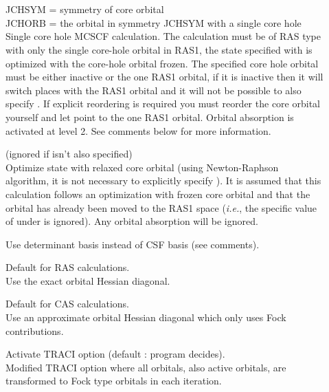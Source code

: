 \begin{description}
\item[] \ \\
   \\
  JCHSYM = symmetry of core orbital\\
  JCHORB = the orbital in symmetry JCHSYM with a single core hole\\
  Single core hole MCSCF calculation. The calculation must be of RAS type
  with only the single core-hole orbital in RAS1, the state specified with
   is optimized with the core-hole orbital
  frozen.
  The specified core hole orbital must be either inactive or
  the one RAS1 orbital, if it is inactive then it will switch places with
  the RAS1 orbital and it will not be possible to also
  specify . If explicit reordering is required you must reorder
  the core orbital yourself and let  point to the one RAS1 orbital.
  Orbital absorption is activated at level 2. See comments below for more information.

\item[]
  (ignored if  isn't also specified)\\
  Optimize state with relaxed core orbital (using Newton-Raphson algorithm,
  it is not necessary to explicitly specify ).
  It is assumed that this calculation follows an optimization
  with frozen core orbital and that the orbital has already been
  moved to the RAS1 space ({\it i.e.\/}, the specific value of
   under  is ignored). Any
  orbital absorption   will be ignored.

\item[]
  Use determinant basis instead of CSF basis (see comments).

\item[]
  Default for RAS calculations.\\
  Use the exact orbital Hessian diagonal.

\item[]
  Default for CAS calculations.\\
  Use an approximate orbital Hessian diagonal which only uses Fock
  contributions.

\item[]
  Activate TRACI option (default : program decides).\\
  Modified TRACI option where all orbitals, also active orbitals, are
  transformed to Fock type orbitals in each iteration.


\end{description}
